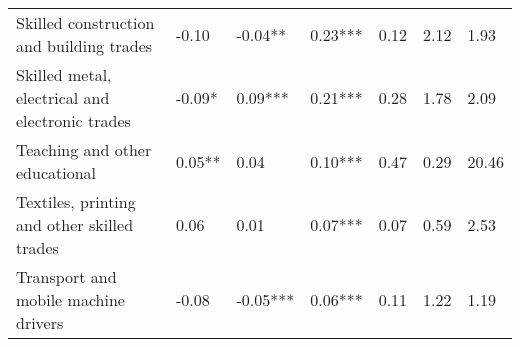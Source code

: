 \begin{tabular}{lllllll}
Skilled construction and building trades & -0.10 & -0.04** & 0.23*** & 0.12 & 2.12 & 1.93 \\
Skilled metal, electrical and electronic trades & -0.09* & 0.09*** & 0.21*** & 0.28 & 1.78 & 2.09 \\
Teaching and other educational & 0.05** & 0.04 & 0.10*** & 0.47 & 0.29 & 20.46 \\
Textiles, printing and other skilled trades & 0.06 & 0.01 & 0.07*** & 0.07 & 0.59 & 2.53 \\
Transport and mobile machine drivers & -0.08 & -0.05*** & 0.06*** & 0.11 & 1.22 & 1.19 \\
\bottomrule
\end{tabular}
